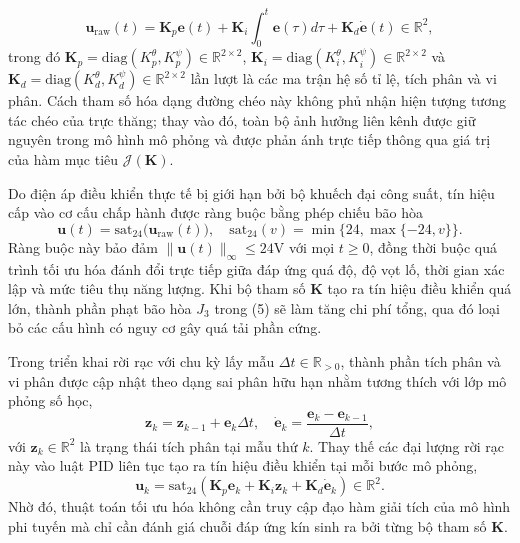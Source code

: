 \documentclass[conference, a4paper]{IEEEtran}
\begin{document}
\begin{equation}
\mathbf{u}_{\mathrm{raw}}(t) = \mathbf{K}_{p}\mathbf{e}(t) + \mathbf{K}_{i}\int_{0}^{t}\mathbf{e}(\tau)d\tau + \mathbf{K}_{d}\dot{\mathbf{e}}(t) \in \mathbb{R}^{2},
\end{equation}
trong đó $\mathbf{K}_{p} = \mathrm{diag}(K_{p}^{\theta}, K_{p}^{\psi}) \in \mathbb{R}^{2\times2}$, $\mathbf{K}_{i} = \mathrm{diag}(K_{i}^{\theta}, K_{i}^{\psi}) \in \mathbb{R}^{2\times2}$ và $\mathbf{K}_{d} = \mathrm{diag}(K_{d}^{\theta}, K_{d}^{\psi}) \in \mathbb{R}^{2\times2}$ lần lượt là các ma trận hệ số tỉ lệ, tích phân và vi phân. Cách tham số hóa dạng đường chéo này không phủ nhận hiện tượng tương tác chéo của trực thăng; thay vào đó, toàn bộ ảnh hưởng liên kênh được giữ nguyên trong mô hình mô phỏng và được phản ánh trực tiếp thông qua giá trị của hàm mục tiêu $\mathcal{J}(\boldsymbol{K})$.

Do điện áp điều khiển thực tế bị giới hạn bởi bộ khuếch đại công suất, tín hiệu cấp vào cơ cấu chấp hành được ràng buộc bằng phép chiếu bão hòa
\begin{equation}
\mathbf{u}(t) = \mathrm{sat}_{24}\big(\mathbf{u}_{\mathrm{raw}}(t)\big), \quad \mathrm{sat}_{24}(v)=\min\{24,\max\{-24,v\}\}.
\end{equation}
Ràng buộc này bảo đảm $\|\mathbf{u}(t)\|_{\infty} \le 24\text{V}$ với mọi $t \ge 0$, đồng thời buộc quá trình tối ưu hóa đánh đổi trực tiếp giữa đáp ứng quá độ, độ vọt lố, thời gian xác lập và mức tiêu thụ năng lượng. Khi bộ tham số $\boldsymbol{K}$ tạo ra tín hiệu điều khiển quá lớn, thành phần phạt bão hòa $J_3$ trong (5) sẽ làm tăng chi phí tổng, qua đó loại bỏ các cấu hình có nguy cơ gây quá tải phần cứng.

Trong triển khai rời rạc với chu kỳ lấy mẫu $\Delta t \in \mathbb{R}_{>0}$, thành phần tích phân và vi phân được cập nhật theo dạng sai phân hữu hạn nhằm tương thích với lớp mô phỏng số học,
\begin{equation}
\mathbf{z}_{k} = \mathbf{z}_{k-1} + \mathbf{e}_{k}\Delta t, \quad \dot{\mathbf{e}}_{k} = \frac{\mathbf{e}_{k}-\mathbf{e}_{k-1}}{\Delta t},
\end{equation}
với $\mathbf{z}_{k} \in \mathbb{R}^{2}$ là trạng thái tích phân tại mẫu thứ $k$. Thay thế các đại lượng rời rạc này vào luật PID liên tục tạo ra tín hiệu điều khiển tại mỗi bước mô phỏng,
\begin{equation}
\mathbf{u}_{k} = \mathrm{sat}_{24}\left(\mathbf{K}_{p}\mathbf{e}_{k} + \mathbf{K}_{i}\mathbf{z}_{k} + \mathbf{K}_{d}\dot{\mathbf{e}}_{k}\right) \in \mathbb{R}^{2}.
\end{equation}
Nhờ đó, thuật toán tối ưu hóa không cần truy cập đạo hàm giải tích của mô hình phi tuyến mà chỉ cần đánh giá chuỗi đáp ứng kín sinh ra bởi từng bộ tham số $\boldsymbol{K}$.
\end{document}
